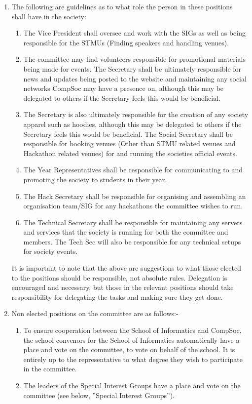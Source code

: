 \documentclass{article}
\begin{document}
\begin {enumerate}
  \item The following are guidelines as to what role the person in these positions shall have in the society:
    \begin{enumerate}
      \item The Vice President shall oversee and work with the SIGs as well as
        being responsible for the STMUs (Finding speakers and handling venues).
      \item The committee may find volunteers responsible for promotional materials
        being made for events. The Secretary shall be ultimately
        responsible for news and updates being posted to the website and
        maintaining any social networks CompSoc may have a presence on,
        although this may be delegated to others if the Secretary feels this
        would be beneficial.
      \item The Secretary is also ultimately responsible for the creation of any
        society apparel such as hoodies, although this may be delegated to others
        if the Secretary feels this would be beneficial. The Social Secretary
        shall be responsible for booking venues (Other than STMU related venues 
        and Hackathon related venues) for and running the societies
        official events.
      \item The Year Representatives shall be responsible for communicating to
        and promoting the society to students in their year.
      \item The Hack Secretary shall be responsible for organising and assembling 
        an organisation team/SIG for any hackathons the committee wishes to run.
      \item The Technical Secretary shall be responsible for maintaining any servers
        and services that the society is running for both the committee and members.
        The Tech Sec will also be responsible for any technical setups for society events.
    \end{enumerate}

    It is important to note that the above are suggestions to what those elected
    to the positions should be responsible, not absolute rules. Delegation is
    encouraged and necessary, but those in the relevant positions should take
    responsibility for delegating the tasks and making sure they get done.
    
    \item Non elected positions on the committee are as follows:-
      \begin{enumerate}
        \item To ensure cooperation between the School of Informatics and CompSoc,
          the school convenors for the School of Informatics automatically
          have a place and vote on the committee, to vote on behalf of the school.
          It is entirely up to the representative to what degree they wish
          to participate in the committee.
        \item The leaders of the Special Interest Groups have a place and vote on
          the committee (see below, ”Special Interest Groups”).
      \end{enumerate}


\end{enumerate}
\end{document}
